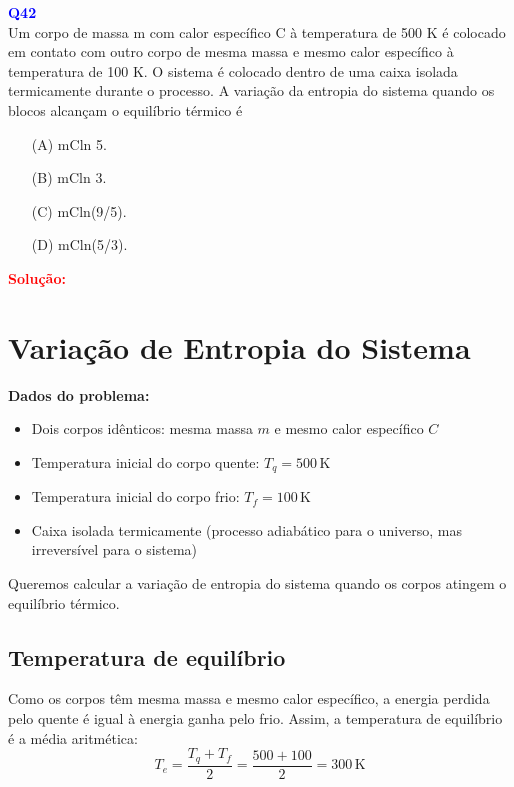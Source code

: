 \documentclass[a4paper,12pt]{article}
\begin{document}
\begin{flushleft}
\textbf{\textcolor{blue}{\Large Q42}}\\
\noindent
Um corpo de massa m com calor específico C à temperatura
de 500 K é colocado em contato com outro corpo de mesma
massa e mesmo calor específico à temperatura de 100 K. O
sistema é colocado dentro de uma caixa isolada
termicamente durante o processo. A variação da entropia do
sistema quando os blocos alcançam o equilíbrio térmico é

\begin{itemize}
\item[(A)] mCln 5.
\item[(B)] mCln 3.
\item[(C)] mCln(9/5).
\item[(D)] mCln(5/3).
\end{itemize}

\vspace{0.5cm}

\textcolor{red}{\textbf{Solução:}}\\

\section*{Variação de Entropia do Sistema}

\textbf{Dados do problema:}
\begin{itemize}
    \item Dois corpos idênticos: mesma massa \(m\) e mesmo calor específico \(C\)
    \item Temperatura inicial do corpo quente: \(T_q = 500\,\mathrm{K}\)
    \item Temperatura inicial do corpo frio: \(T_f = 100\,\mathrm{K}\)
    \item Caixa isolada termicamente (processo adiabático para o universo, mas irreversível para o sistema)
\end{itemize}

Queremos calcular a variação de entropia do sistema quando os corpos atingem o equilíbrio térmico.

\subsection*{Temperatura de equilíbrio}

Como os corpos têm mesma massa e mesmo calor específico, a energia perdida pelo quente é igual à energia ganha pelo frio. Assim, a temperatura de equilíbrio é a média aritmética:
\[
T_e = \frac{T_q + T_f}{2} = \frac{500 + 100}{2} = 300\,\mathrm{K}
\]


\end{flushleft}
\end{document}
